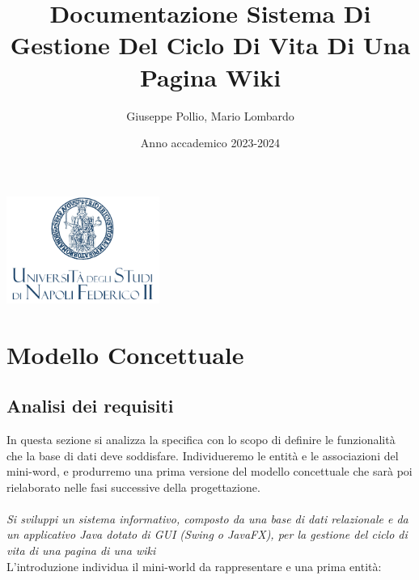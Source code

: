 \documentclass{article}
\title{Documentazione Sistema Di Gestione Del Ciclo Di Vita Di Una Pagina Wiki}
\author{Giuseppe Pollio, Mario Lombardo}
\date{Anno accademico 2023-2024}
\renewcommand{\maketitle}{%
	\begin{titlepage}
		\centering
		\includegraphics[width=5cm]{logo_uni.png}\par\vspace{1cm}
		\huge\bfseries\thetitle\par
		\vspace{1cm}
		\Large\theauthor\par
		\vfill
		\large\thedate\par
	\end{titlepage}
}
\begin{document}
	
	\maketitle
	
	\tableofcontents
	
	\newpage
	
	\section{Modello Concettuale}
	\subsection{Analisi dei requisiti}
	In questa sezione si analizza la specifica con lo scopo di definire le funzionalità
	che la base di dati deve soddisfare. Individueremo le entità e le associazioni
	del mini-word, e produrremo una prima versione del modello concettuale che
	sarà poi rielaborato nelle fasi successive della progettazione.\\ \\
	{\itshape Si sviluppi un sistema informativo, composto da una base di dati relazionale e da un applicativo Java dotato
		di GUI (Swing o JavaFX), per la gestione del ciclo di vita di una pagina di una wiki}
	\vspace{0.5cm}
	\\
	L'introduzione individua il mini-world da rappresentare e una prima entità:
\end{document}
